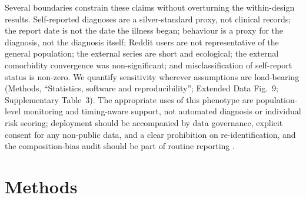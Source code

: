 \documentclass[11pt]{article}
\newcommand{\suptab}[1]{Supplementary Table~#1}
\newcommand{\edfig}[1]{Extended Data Fig.~#1}
\begin{document}
Several boundaries constrain these claims without overturning the within-design results.
Self-reported diagnoses are a silver-standard proxy, not clinical records; the report date is
not the date the illness began; behaviour is a proxy for the diagnosis, not the diagnosis
itself; Reddit
users are not representative of the general population; the external series are short and
ecological; the external comorbidity convergence was non-significant; and misclassification of
self-report status is non-zero. We quantify sensitivity wherever assumptions are load-bearing
(Methods, ``Statistics, software and reproducibility''; \edfig{9}; \suptab{3}). The appropriate uses of this phenotype are
population-level monitoring and timing-aware support, not automated diagnosis or individual
risk scoring; deployment should be accompanied by data governance, explicit consent for any
non-public data, and a clear prohibition on re-identification, and the composition-bias audit
should be part of routine reporting \cite{braund2024hype,pearson2025smartphones}.

\section*{Methods}
\end{document}
